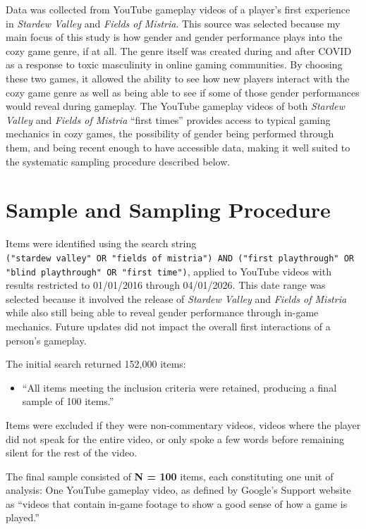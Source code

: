 \documentclass[
  12pt,
  letterpaper,
  DIV=11,
  numbers=noendperiod]{scrreprt}
\providecommand{\tightlist}{%
  \setlength{\itemsep}{0pt}\setlength{\parskip}{0pt}}
\begin{document}
Data was collected from YouTube gameplay videos of a player's first
experience in \emph{Stardew Valley} and \emph{Fields of Mistria}. This
source was selected because my main focus of this study is how gender
and gender performance plays into the cozy game genre, if at all. The
genre itself was created during and after COVID as a response to toxic
masculinity in online gaming communities. By choosing these two games,
it allowed the ability to see how new players interact with the cozy
game genre as well as being able to see if some of those gender
performances would reveal during gameplay. The YouTube gameplay videos
of both \emph{Stardew Valley} and \emph{Fields of Mistria} ``first
times'' provides access to typical gaming mechanics in cozy games, the
possibility of gender being performed through them, and being recent
enough to have accessible data, making it well suited to the systematic
sampling procedure described below.

\section{Sample and Sampling
Procedure}\label{sample-and-sampling-procedure}

Items were identified using the search string
\texttt{("stardew\ valley"\ OR\ "fields\ of\ mistria")\ AND\ ("first\ playthrough"\ OR\ "blind\ playthrough"\ OR\ "first\ time")},
applied to YouTube videos with results restricted to 01/01/2016 through
04/01/2026. This date range was selected because it involved the release
of \emph{Stardew Valley} and \emph{Fields of Mistria} while also still
being able to reveal gender performance through in-game mechanics.
Future updates did not impact the overall first interactions of a
person's gameplay.

The initial search returned 152,000 items:

\begin{itemize}
\tightlist
\item
  ``All items meeting the inclusion criteria were retained, producing a
  final sample of 100 items.''
\end{itemize}

Items were excluded if they were non-commentary videos, videos where the
player did not speak for the entire video, or only spoke a few words
before remaining silent for the rest of the video.

The final sample consisted of \textbf{N = 100} items, each constituting
one unit of analysis: One YouTube gameplay video, as defined by Google's
Support website as ``videos that contain in-game footage to show a good
sense of how a game is played.''
\end{document}
